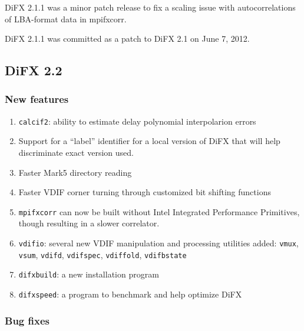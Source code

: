 DiFX 2.1.1 was a minor patch release to fix a scaling issue with autocorrelations of LBA-format data in mpifxcorr.

DiFX 2.1.1 was committed as a patch to DiFX 2.1 on June 7, 2012.

\subsection{DiFX 2.2}

\subsubsection{New features}

\begin{enumerate}
\item {\tt calcif2}: ability to estimate delay polynomial interpolarion errors
\item Support for a ``label'' identifier for a local version of DiFX that will help discriminate exact version used.
\item Faster Mark5 directory reading
\item Faster VDIF corner turning through customized bit shifting functions
\item {\tt mpifxcorr} can now be built without Intel Integrated Performance Primitives, though resulting in a slower correlator.
\item {\tt vdifio}: several new VDIF manipulation and processing utilities added: {\tt vmux}, {\tt vsum}, {\tt vdifd}, {\tt vdifspec}, {\tt vdiffold}, {\tt vdifbstate}
\item {\tt difxbuild}: a new installation program
\item {\tt difxspeed}: a program to benchmark and help optimize DiFX
\end{enumerate}

\subsubsection{Bug fixes}

